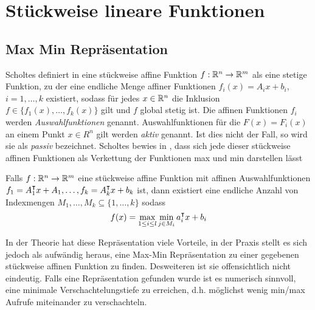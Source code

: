 
\section{Stückweise lineare Funktionen}
\subsection{Max Min Repräsentation}
\label{sec:maxMinRepresentiation}
Scholtes definiert in \cite[S.19]{scholtes2012introduction} eine stückweise affine Funktion $f:\mathbb{R}^n\to \mathbb{R}^m$ als eine stetige Funktion, zu der eine endliche Menge affiner Funktionen $f_i(x)=A_ix+b_i$, $i=1,\ldots,k$ existiert, sodass für jedes $x\in \mathbb{R}^n$ die Inklusion $f\in\lbrace f_1(x),\ldots, f_k(x)\rbrace $ gilt und $f$ global stetig ist. Die affinen Funktionen $f_i$ werden \textit{Auswahlfunktionen} genannt. 
Auswahlfunktionen für die $F(x) = F_i(x)$ an einem Punkt $x\in R^n$ gilt werden \textit{aktiv} genannt. Ist dies nicht der Fall, so wird sie als \textit{passiv} bezeichnet.
Scholtes bewies in \cite[Prop.2.2.2.]{scholtes2012introduction}, dass sich jede dieser stückweise affinen Funktionen als Verkettung der Funktionen max und min darstellen lässt
\begin{theorem}
 Falls $f:\mathbb{R}^n\to \mathbb{R}^m$ eine stückweise affine Funktion mit affinen Auswahlfunktionen $f_1=A_1^\intercal x+ A_1,\ldots,f_k=A_k^\intercal x+ b_k$ ist, dann existiert eine endliche Anzahl von Indexmengen $M_1,\ldots,M_k\subseteq \lbrace 1,\ldots,k\rbrace$ sodass
 \begin{equation}
 \label{eq:maxMinRepresentiation}
  f(x) = \max_{1\leq i\leq l} \min_{j\in M_i} a_i^\intercal x + b_i
 \end{equation}
 
\end{theorem}
In der Theorie hat diese Repräsentation viele Vorteile, in der Praxis stellt es sich jedoch als aufwändig heraus, eine Max-Min Repräsentation zu einer gegebenen stückweise affinen Funktion zu finden. Desweiteren ist sie offensichtlich nicht eindeutig. Falls eine Repräsentation gefunden wurde ist es numerisch sinnvoll, eine minimale Verschachtelungstiefe zu erreichen, d.h. möglichst wenig min/max Aufrufe miteinander zu verschachteln. 

